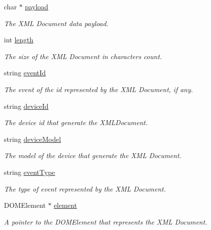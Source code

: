 \begin{DoxyCompactItemize}
\item 
char $\ast$ \hyperlink{structbr_1_1ufscar_1_1lince_1_1mmi_1_1XMLData_acb4585b181dc5f39f52139ca7b283e30}{payload}
\begin{DoxyCompactList}\small\item\em The XML Document data payload. \item\end{DoxyCompactList}\item 
int \hyperlink{structbr_1_1ufscar_1_1lince_1_1mmi_1_1XMLData_a9ac82d47f1432982ed44302b131cb5f4}{length}
\begin{DoxyCompactList}\small\item\em The size of the XML Document in characters count. \item\end{DoxyCompactList}\item 
string \hyperlink{structbr_1_1ufscar_1_1lince_1_1mmi_1_1XMLData_a935adfb380fdda5f8974a2c7d3f22dbc}{eventId}
\begin{DoxyCompactList}\small\item\em The event of the id represented by the XML Document, if any. \item\end{DoxyCompactList}\item 
string \hyperlink{structbr_1_1ufscar_1_1lince_1_1mmi_1_1XMLData_a92e61d16cbc65de1a7f1d815764abe80}{deviceId}
\begin{DoxyCompactList}\small\item\em The device id that generate the XMLDocument. \item\end{DoxyCompactList}\item 
string \hyperlink{structbr_1_1ufscar_1_1lince_1_1mmi_1_1XMLData_aac91cad138e3bae02ec780761336753e}{deviceModel}
\begin{DoxyCompactList}\small\item\em The model of the device that generate the XML Document. \item\end{DoxyCompactList}\item 
string \hyperlink{structbr_1_1ufscar_1_1lince_1_1mmi_1_1XMLData_adc53af9aa385a0a3784c63b08cb4a23f}{eventType}
\begin{DoxyCompactList}\small\item\em The type of event represented by the XML Document. \item\end{DoxyCompactList}\item 
DOMElement $\ast$ \hyperlink{structbr_1_1ufscar_1_1lince_1_1mmi_1_1XMLData_ac82930d92cff483fd703331560acb8d1}{element}
\begin{DoxyCompactList}\small\item\em A pointer to the DOMElement that represents the XML Document. \item\end{DoxyCompactList}\end{DoxyCompactItemize}


